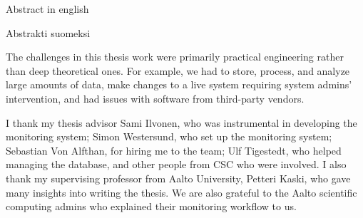 \makecoverpage
\makecopyrightpage

\begin{abstractpage}[english]
Abstract in english
\end{abstractpage}

\begin{abstractpage}[finnish]
Abstrakti suomeksi
\end{abstractpage}

The challenges in this thesis work were primarily practical engineering rather than deep theoretical ones.
For example, we had to store, process, and analyze large amounts of data, make changes to a live system requiring system admins' intervention, and had issues with software from third-party vendors.

I thank my thesis advisor Sami Ilvonen, who was instrumental in developing the monitoring system; Simon Westersund, who set up the monitoring system; Sebastian Von Alfthan, for hiring me to the team; Ulf Tigestedt, who helped managing the database, and other people from CSC who were involved.
I also thank my supervising professor from Aalto University, Petteri Kaski, who gave many insights into writing the thesis.
We are also grateful to the Aalto scientific computing admins who explained their monitoring workflow to us.

\newpage

\setcounter{tocdepth}{2}
\thesistableofcontents
